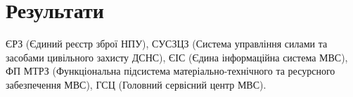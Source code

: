 \chapter{Результати}

ЄРЗ (Єдиний реєстр зброї НПУ),
СУСЗЦЗ (Система управління силами та засобами цивільного захисту ДСНС),
ЄІС (Єдина інформаційна система МВС),
ФП МТРЗ (Функціональна підсистема матеріально-технічного та ресурсного забезпечення МВС),
ГСЦ (Головний сервісний центр МВС).

